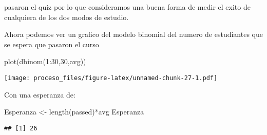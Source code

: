 \documentclass[
]{article}
\newenvironment{Shaded}{\begin{snugshade}}{\end{snugshade}}
\newcommand{\DecValTok}[1]{\textcolor[rgb]{0.00,0.00,0.81}{#1}}
\newcommand{\FunctionTok}[1]{\textcolor[rgb]{0.00,0.00,0.00}{#1}}
\newcommand{\NormalTok}[1]{#1}
\newcommand{\OtherTok}[1]{\textcolor[rgb]{0.56,0.35,0.01}{#1}}
\newcommand{\SpecialCharTok}[1]{\textcolor[rgb]{0.00,0.00,0.00}{#1}}
\begin{document}
pasaron el quiz por lo que consideramos una buena forma de medir el
exito de cualquiera de los dos modos de estudio.

Ahora podemos ver un grafico del modelo binomial del numero de
estudiantes que se espera que pasaron el curso

\begin{Shaded}
\begin{Highlighting}[]
\FunctionTok{plot}\NormalTok{(}\FunctionTok{dbinom}\NormalTok{(}\DecValTok{1}\SpecialCharTok{:}\DecValTok{30}\NormalTok{,}\DecValTok{30}\NormalTok{,avg))}
\end{Highlighting}
\end{Shaded}

\texttt{[image: proceso\_files/figure-latex/unnamed-chunk-27-1.pdf]}

Con una esperanza de:

\begin{Shaded}
\begin{Highlighting}[]
\NormalTok{Esperanza }\OtherTok{\textless{}{-}} \FunctionTok{length}\NormalTok{(passed)}\SpecialCharTok{*}\NormalTok{avg}
\NormalTok{Esperanza}
\end{Highlighting}
\end{Shaded}

\begin{verbatim}
## [1] 26
\end{verbatim}
\end{document}
